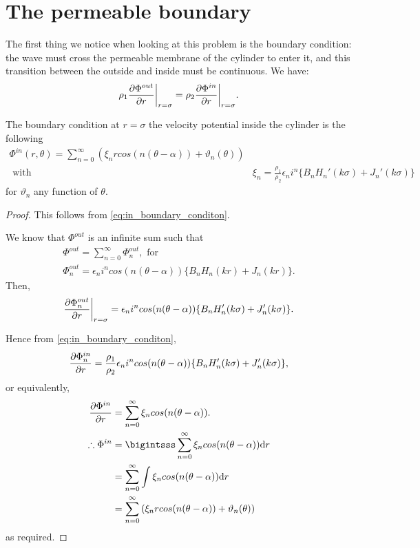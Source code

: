 \section{The permeable boundary}
The first thing we notice when looking at this problem is the boundary condition: the wave must cross the permeable membrane of the cylinder to enter it, and this transition between the outside and inside must be continuous. We have:
%
  \begin{equation}\label{eq:in_boundary_conditon}
    \rho_1 \frac{\partial \Phi^{out}}{\partial r}\bigg\vert_{r=\sigma} = \rho_2 \frac{\partial \Phi^{in}}{\partial r}\bigg\vert_{r=\sigma}.
  \end{equation}\par
%
  \begin{propn}\label{propn:in_boundary_condition_integral}
    The boundary condition at $r=\sigma$ the velocity potential inside the cylinder is the following
      \begin{align*}
        \Phi^{in}(r, \theta) = \sum^\infty_{n=0} \left( \xi_n r cos(n(\theta-\alpha)) + \vartheta_n(\theta) \right)& \\
        \text{ with } &\xi_n = \frac{\rho_1}{\rho_2}\epsilon_n i^n\{ B_n H_n'(k\sigma) + J_n'(k\sigma) \}
      \end{align*}
    for $\vartheta_n$ any function of $\theta$.
  \end{propn}
%
  \begin{proof}
    This follows from \eqref{eq:in_boundary_conditon}. \par
    We know that $\Phi^{out}$ is an infinite sum such that
      \begin{gather*}
        \Phi^{out} = \sum^{\infty}_{n=0} \Phi^{out}_n, \text{ for } \\
        \Phi^{out}_n = \epsilon_n i^n cos(n(\theta-\alpha)) \{ B_n H_n(kr) + J_n(kr) \}.
      \end{gather*}
    Then,
      \begin{equation}
        \frac{\partial \Phi^{out}_n}{\partial r}\bigg\vert_{r=\sigma} = \epsilon_n i^n cos(n(\theta-\alpha)) \{ B_n H_n'(k\sigma) + J_n'(k\sigma) \}.
      \end{equation}\par
    Hence from \eqref{eq:in_boundary_conditon},
      \begin{equation}
        \frac{\partial \Phi^{in}_n}{\partial r} = \frac{\rho_1}{\rho_2}\epsilon_n i^n cos(n(\theta-\alpha)) \{ B_n H_n'(k\sigma) + J_n'(k\sigma) \},
      \end{equation}
    or equivalently,
      \begin{align}
        \partialfrac{\Phi^{in}}{r} &= \sum^\infty_{n=0} \xi_n cos(n(\theta-\alpha)). \\
        \therefore \Phi^{in} &= \bigintsss \sum^\infty_{n=0} \xi_n cos(n(\theta-\alpha)) \mathrm{d}r \\
          &= \sum^\infty_{n=0} \int\xi_n cos(n(\theta-\alpha)) \mathrm{d}r \\
          &= \sum^\infty_{n=0} \left( \xi_n r cos(n(\theta-\alpha)) + \vartheta_n(\theta) \right)
      \end{align}
    as required.
  \end{proof}
%
